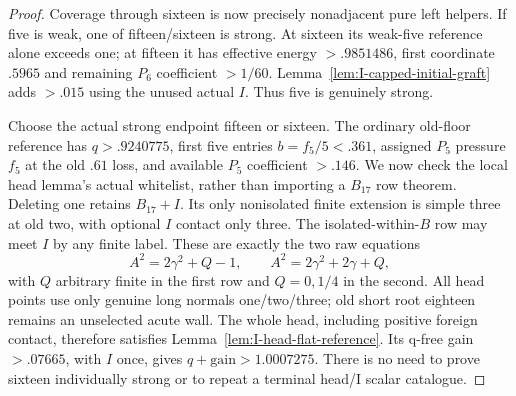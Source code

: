 \documentclass[11pt]{article}
\theoremstyle{definition}
\theoremstyle{remark}
\begin{document}
\begin{proof}
Coverage through sixteen is now precisely nonadjacent pure left
helpers. If five is weak, one of fifteen/sixteen is strong.
At sixteen its weak-five reference alone exceeds one; at fifteen
it has effective energy $>.9851486$, first coordinate $.5965$
and remaining $P_6$ coefficient $>1/60$.
Lemma~\ref{lem:I-capped-initial-graft} adds $>.015$ using
the unused actual $I$. Thus five is genuinely strong.

Choose the actual strong endpoint fifteen or sixteen.
The ordinary old-floor reference has $q>.9240775$, first
five entries $b=f_5/5<.361$, assigned $P_5$ pressure $f_5$
at the old $.61$ loss, and available $P_5$ coefficient $>.146$.
We now check the local head lemma's actual whitelist, rather
than importing a $B_{17}$ row theorem. Deleting one retains
$B_{17}+I$. Its only nonisolated finite extension is simple
three at old two, with optional $I$ contact only three.
The isolated-within-$B$ row may meet $I$ by any finite label.
These are exactly the two raw equations
\[
 A^2=2\gamma^2+Q-1,\qquad
 A^2=2\gamma^2+2\gamma+Q,
\]
with $Q$ arbitrary finite in the first row and $Q=0,1/4$ in
the second. All head points use only genuine long normals
one/two/three; old short root eighteen remains an unselected
acute wall. The whole head, including positive foreign contact,
therefore satisfies Lemma~\ref{lem:I-head-flat-reference}.
Its q-free gain $>.07665$, with $I$ once, gives
$q+\text{gain}>1.0007275$.
There is no need to prove sixteen individually strong or to
repeat a terminal head/I scalar catalogue.
\end{proof}
\end{document}
